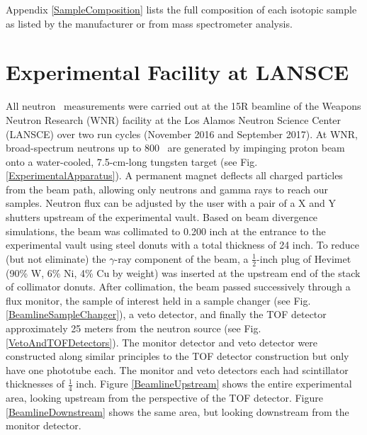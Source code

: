Appendix \ref{SampleComposition} lists the full composition of each isotopic
sample as listed by the manufacturer or from mass spectrometer analysis.

\section{Experimental Facility at LANSCE}
All neutron \tot\ measurements were carried out at the 15R
beamline of the Weapons Neutron Research (WNR) facility at the Los Alamos
Neutron Science Center (LANSCE) over two run cycles (November 2016 and
September 2017). At WNR, broad-spectrum neutrons up
to 800 \mega\electronvolt\ are generated by impinging proton beam onto a water-cooled, 7.5-cm-long
tungsten target (see Fig. \ref{ExperimentalApparatus}). A 
permanent magnet deflects all charged particles from the beam path, 
allowing only neutrons and gamma rays to reach our samples. Neutron flux can be
adjusted by the user with a pair of a X and Y shutters upstream of the
experimental vault. Based on beam divergence
simulations, the beam was collimated to 0.200 inch at the entrance to the
experimental vault using steel donuts with a total thickness of 24 inch.
To reduce (but not eliminate) the $\gamma$-ray component of the beam,
a $\frac{1}{2}$-inch plug of Hevimet (90\% W, 6\% 
Ni, 4\% Cu by weight) was inserted at the upstream end of the
stack of collimator donuts. After collimation, the beam passed successively through a flux 
monitor, the sample of interest held in a sample changer (see Fig.
\ref{BeamlineSampleChanger}), a veto detector, and finally the 
TOF detector approximately 25 meters from the neutron source (see Fig.
\ref{VetoAndTOFDetectors}). The monitor detector and veto detector
were constructed along similar principles to the TOF
detector construction but only have one phototube each. The monitor and
veto detectors each had scintillator thicknesses of $\frac{1}{4}$ inch.
Figure \ref{BeamlineUpstream} shows the entire experimental area, looking upstream
from the perspective of the TOF
detector. Figure \ref{BeamlineDownstream} shows the same area, but looking
downstream from the monitor detector.
